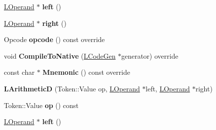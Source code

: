 \begin{DoxyCompactItemize}
\item 
\hyperlink{classv8_1_1internal_1_1_l_operand}{L\+Operand} $\ast$ {\bfseries left} ()\hypertarget{classv8_1_1internal_1_1_l_arithmetic_d_a8d143eb5deb9725b2544b7ecc1a6b7aa}{}\label{classv8_1_1internal_1_1_l_arithmetic_d_a8d143eb5deb9725b2544b7ecc1a6b7aa}

\item 
\hyperlink{classv8_1_1internal_1_1_l_operand}{L\+Operand} $\ast$ {\bfseries right} ()\hypertarget{classv8_1_1internal_1_1_l_arithmetic_d_ad78701fa7af5138fc5a741a1ceed96a7}{}\label{classv8_1_1internal_1_1_l_arithmetic_d_ad78701fa7af5138fc5a741a1ceed96a7}

\item 
Opcode {\bfseries opcode} () const  override\hypertarget{classv8_1_1internal_1_1_l_arithmetic_d_a6371d86c37944a1a90b2e4778d0b7024}{}\label{classv8_1_1internal_1_1_l_arithmetic_d_a6371d86c37944a1a90b2e4778d0b7024}

\item 
void {\bfseries Compile\+To\+Native} (\hyperlink{classv8_1_1internal_1_1_l_code_gen}{L\+Code\+Gen} $\ast$generator) override\hypertarget{classv8_1_1internal_1_1_l_arithmetic_d_a87834ef9f5e37f8ade4c8e8ef4284572}{}\label{classv8_1_1internal_1_1_l_arithmetic_d_a87834ef9f5e37f8ade4c8e8ef4284572}

\item 
const char $\ast$ {\bfseries Mnemonic} () const  override\hypertarget{classv8_1_1internal_1_1_l_arithmetic_d_a401c29ddc6c8aa2dc41d23d4be14aff7}{}\label{classv8_1_1internal_1_1_l_arithmetic_d_a401c29ddc6c8aa2dc41d23d4be14aff7}

\item 
{\bfseries L\+ArithmeticD} (Token\+::\+Value op, \hyperlink{classv8_1_1internal_1_1_l_operand}{L\+Operand} $\ast$left, \hyperlink{classv8_1_1internal_1_1_l_operand}{L\+Operand} $\ast$right)\hypertarget{classv8_1_1internal_1_1_l_arithmetic_d_aad5c45947dcad72abbbcd55b081f4e6e}{}\label{classv8_1_1internal_1_1_l_arithmetic_d_aad5c45947dcad72abbbcd55b081f4e6e}

\item 
Token\+::\+Value {\bfseries op} () const \hypertarget{classv8_1_1internal_1_1_l_arithmetic_d_a0689ba0a4deee0bb4450bb0fdc7f877b}{}\label{classv8_1_1internal_1_1_l_arithmetic_d_a0689ba0a4deee0bb4450bb0fdc7f877b}

\item 
\hyperlink{classv8_1_1internal_1_1_l_operand}{L\+Operand} $\ast$ {\bfseries left} ()\hypertarget{classv8_1_1internal_1_1_l_arithmetic_d_a8d143eb5deb9725b2544b7ecc1a6b7aa}{}\label{classv8_1_1internal_1_1_l_arithmetic_d_a8d143eb5deb9725b2544b7ecc1a6b7aa}


\end{DoxyCompactItemize}
